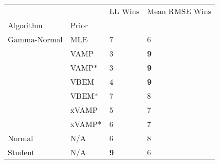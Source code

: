 \begin{tabular}{llll}
\toprule
        &     &     LL Wins & Mean RMSE Wins \\
Algorithm & Prior &             &                \\
\midrule
Gamma-Normal & MLE &           7 &              6 \\
        & VAMP &           3 &     \textbf{9} \\
        & VAMP* &           3 &     \textbf{9} \\
        & VBEM &           4 &     \textbf{9} \\
        & VBEM* &           7 &              8 \\
        & xVAMP &           5 &              7 \\
        & xVAMP* &           6 &              7 \\
Normal & N/A &           6 &              8 \\
Student & N/A &  \textbf{9} &              6 \\
\bottomrule
\end{tabular}


